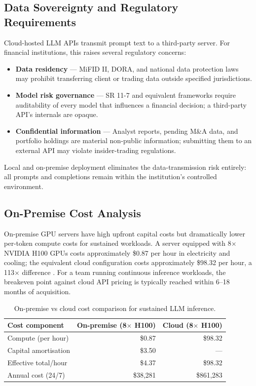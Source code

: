 \subsection{Data Sovereignty and Regulatory Requirements}
\label{app:hf:sovereignty}

Cloud-hosted LLM APIs transmit prompt text to a third-party server.  For
financial institutions, this raises several regulatory concerns:

\begin{itemize}
  \item \textbf{Data residency} --- MiFID II, DORA, and national data
        protection laws may prohibit transferring client or trading data
        outside specified jurisdictions.
  \item \textbf{Model risk governance} --- SR 11-7 and equivalent frameworks
        require auditability of every model that influences a financial
        decision; a third-party API's internals are opaque.
  \item \textbf{Confidential information} --- Analyst reports, pending M\&A
        data, and portfolio holdings are material non-public information;
        submitting them to an external API may violate insider-trading
        regulations.
\end{itemize}

Local and on-premise deployment eliminates the data-transmission risk entirely:
all prompts and completions remain within the institution's controlled
environment.

\subsection{On-Premise Cost Analysis}
\label{app:hf:cost}

On-premise GPU servers have high upfront capital costs but dramatically lower
per-token compute costs for sustained workloads.  A server equipped with
8$\times$ NVIDIA H100 GPUs costs approximately \$0.87 per hour in electricity
and cooling; the equivalent cloud configuration costs approximately \$98.32 per
hour, a 113$\times$ difference \citep{openai2025codex}.  For a team running
continuous inference workloads, the breakeven point against cloud API pricing
is typically reached within 6--18 months of acquisition.

\begin{table}[ht]
\centering
\caption{On-premise vs cloud cost comparison for sustained LLM inference.}
\label{tab:onprem-cost}
\begin{tabular}{lrr}
\toprule
\textbf{Cost component} & \textbf{On-premise (8$\times$ H100)} & \textbf{Cloud (8$\times$ H100)} \\
\midrule
Compute (per hour)    & \$0.87  & \$98.32 \\
Capital amortisation  & \$3.50  & ---     \\
Effective total/hour  & \$4.37  & \$98.32 \\
Annual cost (24/7)    & \$38{,}281 & \$861{,}283 \\
\bottomrule
\end{tabular}
\end{table}

